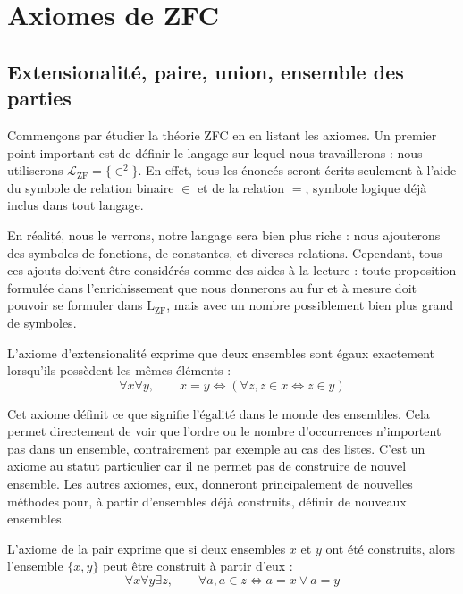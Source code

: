 \section{Axiomes de ZFC}

\subsection[Premiers axiomes]{Extensionalité, paire, union, ensemble des parties}

Commençons par étudier la théorie ZFC en en listant les axiomes. Un premier point
important est de définir le langage sur lequel nous travaillerons : nous
utiliserons $\mathcal L_{\mathrm{ZF}} = \{ \in^2\}$. En effet, tous les énoncés
seront écrits seulement à l'aide du symbole de relation binaire $\in$ et de la
relation $=$, symbole logique déjà inclus dans tout langage.

\begin{remark}
  En réalité, nous le verrons, notre langage sera bien plus riche : nous
  ajouterons des symboles de fonctions, de constantes, et diverses relations.
  Cependant, tous ces ajouts doivent être considérés comme des aides à la lecture
  : toute proposition formulée dans l'enrichissement que nous donnerons au fur
  et à mesure doit pouvoir se formuler dans $\mathrm L_{\mathrm{ZF}}$, mais avec un
  nombre possiblement bien plus grand de symboles.
\end{remark}

\begin{axiom}[Extensionalité]
  L'axiome d'extensionalité exprime que deux ensembles sont égaux exactement
  lorsqu'ils possèdent les mêmes éléments :
  \[\forall x \forall y, \qquad x = y \iff (\forall z, z \in x\iff z \in y)\]
\end{axiom}

Cet axiome définit ce que signifie l'égalité dans le monde des ensembles. Cela
permet directement de voir que l'ordre ou le nombre d'occurrences n'importent pas
dans un ensemble, contrairement par exemple au cas des listes. C'est un axiome au
statut particulier car il ne permet pas de construire de nouvel ensemble. Les
autres axiomes, eux, donneront principalement de nouvelles méthodes pour, à
partir d'ensembles déjà construits, définir de nouveaux ensembles.

\begin{axiom}[Paire]\label{ax.ZF.pair}
  L'axiome de la pair exprime que si deux ensembles $x$ et $y$ ont été
  construits, alors l'ensemble $\{x,y\}$ peut être construit à partir d'eux :
  \[\forall x \forall y \exists z, \qquad \forall a, a \in z \iff
  a = x \lor a = y\]
\end{axiom}

